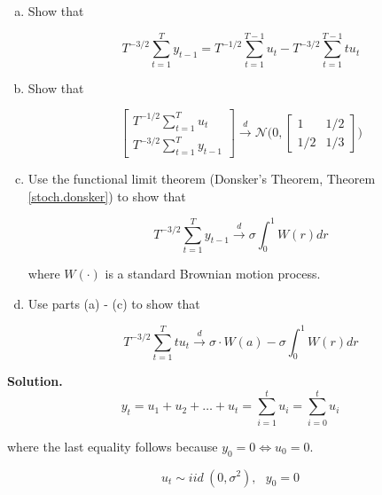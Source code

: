 \begin{enumerate}[(a)]

\item Show that

\[
 T^{-3/2} \sum_{t=1}^T y_{t-1} =T^{-1/2}  \sum_{t=1}^{T- 1} u_{t} -  T^{-3/2} \sum_{t=1}^{T - 1} t u_{t}
\]

\item Show that

\[
\begin{bmatrix} T^{-1/2} \sum_{t=1}^T u_t \\ T^{-3/2} \sum_{t=1}^T y_{t-1} \end{bmatrix} \xrightarrow{d} \mathcal{N} \bigg(0, \begin{bmatrix} 1 & 1/2 \\ 1/2 & 1/3 \end{bmatrix} \bigg)
\]

\item Use the functional limit theorem (Donsker's Theorem, Theorem \ref{stoch.donsker}) to show that 

\[
T^{-3/2} \sum_{t=1}^T y_{t-1} \xrightarrow{d} \sigma \int_0^1 W(r) dr
\]

where \(W(\cdot)\) is a standard Brownian motion process.

\item Use parts (a) - (c) to show that

\[
T^{-3/2} \sum_{t=1}^T t u_t \xrightarrow{d} \sigma \cdot W(a) - \sigma \int_0^1 W(r) dr
\]

\end{enumerate}


\textbf{Solution.} \[
y_t = u_1 + u_2 + \ldots + u_t = \sum_{i=1}^t u_i = \sum_{i=0}^t u_i
\]

where the last equality follows because \(y_0 = 0 \iff u_0 = 0\).

\[
u_t \sim iid \ (0, \sigma^2), \ \ \ y_0 = 0
\]

